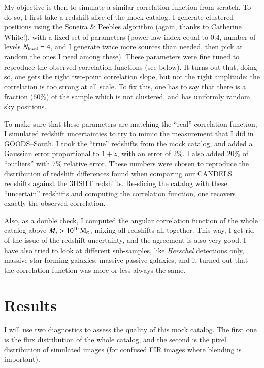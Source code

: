 \documentclass[12pt,a4paper]{article}
\newcommand{\herschel}{{\it Herschel}\xspace}
\newcommand{\msun}{{\rm M}_\odot}
\newcommand{\mstar}{M_\ast}
\begin{document}
My objective is then to simulate a similar correlation function from scratch. To do so, I first take a redshift slice of the mock catalog. I generate clustered positions using the Soneira \& Peebles algorithm (again, thanks to Catherine White!), with a fixed set of parameters (power law index equal to $0.4$, number of levels $N_{\rm level} = 4$, and I generate twice more sources than needed, then pick at random the ones I need among these). These parameters were fine tuned to reproduce the observed correlation functions (see below). It turns out that, doing so, one gets the right two-point correlation slope, but not the right amplitude: the correlation is too strong at all scale. To fix this, one has to say that there is a fraction ($60\%$) of the sample which is not clustered, and has uniformly random sky positions.

To make sure that these parameters are matching the ``real'' correlation function, I simulated redshift uncertainties to try to mimic the measurement that I did in GOODS--South. I took the ``true'' redshifts from the mock catalog, and added a Gaussian error proportional to $1+z$, with an error of $2\%$. I also added $20\%$ of ``outliers'' with $7\%$ relative error. These numbers were chosen to reproduce the distribution of redshift differences found when comparing our CANDELS redshifts against the 3DSHT redshifts. Re-slicing the catalog with these ``uncertain'' redshifts and computing the correlation function, one recovers exactly the observed correlation.

Also, as a double check, I computed the angular correlation function of the whole catalog above $\mstar > 10^{10}\,\msun$, mixing all redshifts all together. This way, I get rid of the issue of the redshift uncertainty, and the agreement is also very good. I have also tried to look at different sub-samples, like \herschel detections only, massive star-forming galaxies, massive passive galaxies, and it turned out that the correlation function was more or less always the same.


\section{Results}

I will use two diagnostics to assess the quality of this mock catalog. The first one is the flux distribution of the whole catalog, and the second is the pixel distribution of simulated images (for confused FIR images where blending is important).
\end{document}
